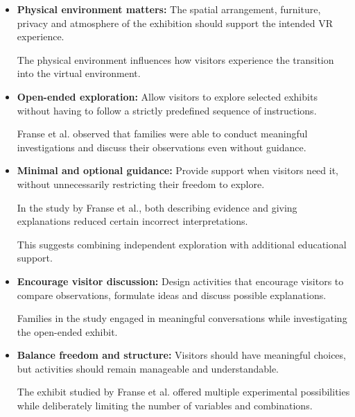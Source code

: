 \begin{itemize}
    The onboarding procedure should not assume that every
    visitor is already familiar with immersive technology.
    \cite[pp.~101--103]{whittaker_onboarding_2025}

    \item \textbf{Physical environment matters:}
    The spatial arrangement, furniture, privacy and atmosphere
    of the exhibition should support the intended VR experience.

    The physical environment influences how visitors experience
    the transition into the virtual environment.
    \cite[p.~100]{whittaker_onboarding_2025}

    \item \textbf{Open-ended exploration:}
    Allow visitors to explore selected exhibits without having
    to follow a strictly predefined sequence of instructions.

    Franse et al. observed that families were able to conduct
    meaningful investigations and discuss their observations
    even without guidance.
    \cite[pp.~721--723]{franse_families_2021}

    \item \textbf{Minimal and optional guidance:}
    Provide support when visitors need it, without unnecessarily
    restricting their freedom to explore.

    In the study by Franse et al., both describing evidence and
    giving explanations reduced certain incorrect interpretations.

    This suggests combining independent exploration with
    additional educational support.
    \cite[pp.~727,~733--734]{franse_families_2021}

    \item \textbf{Encourage visitor discussion:}
    Design activities that encourage visitors to compare
    observations, formulate ideas and discuss possible explanations.

    Families in the study engaged in meaningful conversations
    while investigating the open-ended exhibit.
    \cite[pp.~721--723]{franse_families_2021}

    \item \textbf{Balance freedom and structure:}
    Visitors should have meaningful choices, but activities
    should remain manageable and understandable.

    The exhibit studied by Franse et al. offered multiple
    experimental possibilities while deliberately limiting
    the number of variables and combinations.
    \cite[p.~728]{franse_families_2021}


\end{itemize}
